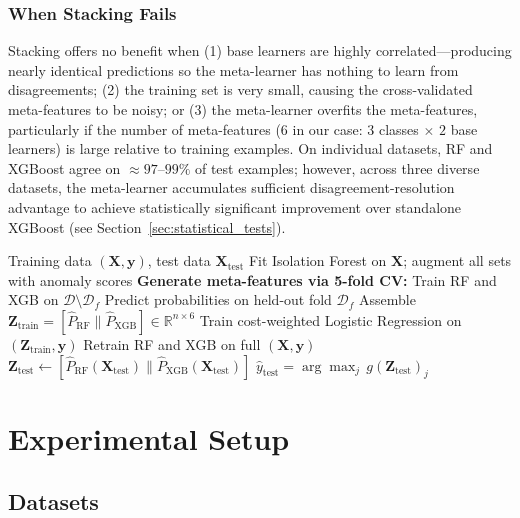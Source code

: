 \documentclass[conference]{IEEEtran}
\begin{document}
\subsubsection{When Stacking Fails}
Stacking offers no benefit when (1) base learners are highly correlated---producing nearly
identical predictions so the meta-learner has nothing to learn from disagreements;
(2) the training set is very small, causing the cross-validated meta-features to be noisy;
or (3) the meta-learner overfits the meta-features, particularly if the number of meta-features
(6 in our case: $3$ classes $\times$ $2$ base learners) is large relative to training examples.
On individual datasets, RF and XGBoost agree on $\approx 97$--$99\%$ of test examples;
however, across three diverse datasets, the meta-learner accumulates sufficient
disagreement-resolution advantage to achieve statistically significant improvement
over standalone XGBoost (see Section~\ref{sec:statistical_tests}).

\begin{algorithm}[t]
\caption{Stacking Ensemble for Alert Triage}
\label{alg:stacking}
\begin{algorithmic}[1]
\REQUIRE Training data $(\mathbf{X}, \mathbf{y})$, test data $\mathbf{X}_{\text{test}}$
\STATE Fit Isolation Forest on $\mathbf{X}$; augment all sets with anomaly scores
\STATE \textbf{Generate meta-features via 5-fold CV:}
    \STATE Train RF and XGB on $\mathcal{D} \setminus \mathcal{D}_f$
    \STATE Predict probabilities on held-out fold $\mathcal{D}_f$
  \ENDFOR
\STATE Assemble $\mathbf{Z}_{\text{train}} = [\hat{P}_{\text{RF}} \| \hat{P}_{\text{XGB}}] \in \mathbb{R}^{n \times 6}$
\STATE Train cost-weighted Logistic Regression on $(\mathbf{Z}_{\text{train}}, \mathbf{y})$
\STATE Retrain RF and XGB on full $(\mathbf{X}, \mathbf{y})$
\STATE $\mathbf{Z}_{\text{test}} \leftarrow [\hat{P}_{\text{RF}}(\mathbf{X}_{\text{test}}) \| \hat{P}_{\text{XGB}}(\mathbf{X}_{\text{test}})]$
\RETURN $\hat{y}_{\text{test}} = \arg\max_j \, g(\mathbf{Z}_{\text{test}})_j$
\end{algorithmic}
\end{algorithm}

\section{Experimental Setup}
\label{sec:setup}

\subsection{Datasets}
\label{sec:datasets}
\end{document}
